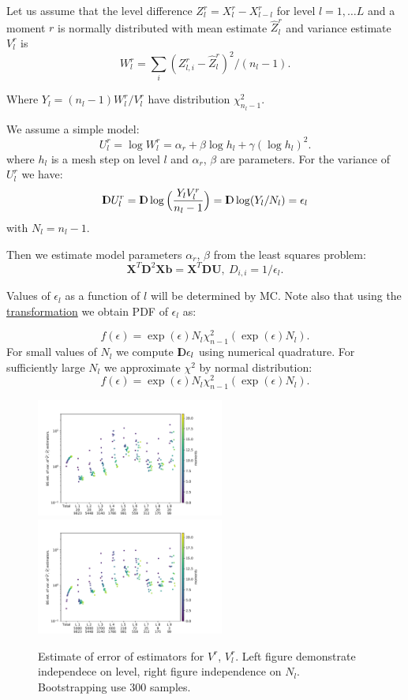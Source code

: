 \documentclass{article}
\def\vc#1{\mathbf{\boldsymbol{#1}}}     %
\def\tn#1{\boldsymbol{#1}}
\def \D{{{\rm I\kern-.3em D}}}
\begin{document}
Let us assume that the level difference $Z_l^r = X_l^r - X^r_{l-l}$ for level $l=1,\dots L$ and a moment $r$ is normally distributed 
with mean estimate $\hat{Z}_l^r$ and variance estimate $V_l^r$ is
$$
W_l^r = \sum_{i} (Z^r_{l,i} - \hat{Z}_l^r)^2 / (n_l - 1).
$$

Where $Y_l = (n_l -1)W_l^r/V_l^r$ have distribution $\chi^2_{n_l -1}$.

We assume a simple model:
$$
  U_l^r = \log W_l^r =  \alpha_r + \beta \log h_l + \gamma (\log h_l)^2.
$$
where $h_l$ is a mesh step on level $l$ and $\alpha_r$, $\beta$ are parameters. 
For the variance of $U_l^r$ we have:
$$
  \D U_l^r = \D \log \Big( \frac{Y_l V_l^r}{n_l - 1} \Big) = \D \log (Y_l/N_l) = \epsilon_l
$$
with $N_l = n_l - 1$.

Then we estimate model parameters $\alpha_r$, $\beta$ from the least squares problem:
$$
    \tn{X}^T \tn{D}^2 \tn{X} \vc{b} = \tn{X}^T \tn{D} \vc{U},
    \ D_{i,i} = 1/\epsilon_{l}.
$$

Values of $\epsilon_l$ as a function of $l$ will be determined by MC. Note also that using the 
\href{https://www.researchgate.net/post/How_can_I_obtain_the_PDF_of_the_logarithm_of_a_chi-squared_random_variable}{transformation} we obtain PDF of $\epsilon_l$ as:

$$
    f(\epsilon) = \exp(\epsilon)N_l\chi^2_{n-1}(\exp(\epsilon)N_l).
$$
For small values of $N_l$ we compute $\D \epsilon_l$ using numerical quadrature. For sufficiently large $N_l$ we approximate $\chi^2$ by normal distribution:
$$
    f(\epsilon) = \exp(\epsilon)N_l\chi^2_{n-1}(\exp(\epsilon)N_l).
$$

\begin{figure}
 \includegraphics[width=0.55\textwidth]{bs_var_var_20.pdf}
 \hspace{-0.1\textwidth}
 \includegraphics[width=0.55\textwidth]{bs_var_var_Nl.pdf}
 \caption{Estimate of error of estimators for $V^r$, $V_l^r$. Left figure demonstrate independece on level, right figure independence on $N_l$. Bootstrapping use 300 samples.}
 \label{fig:bs_var_var}
\end{figure}
\end{document}

